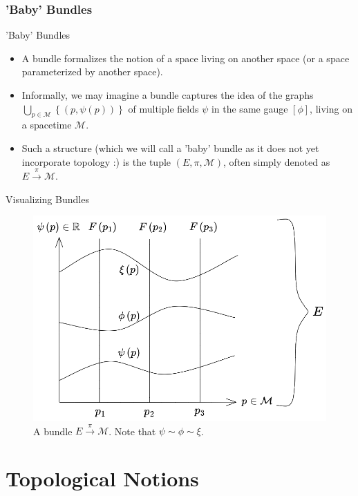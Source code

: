 \documentclass[9pt,handout]{beamer}
\begin{document}
\subsubsection{'Baby' Bundles}
\begin{frame}{'Baby' Bundles}
\begin{itemize}
\item A bundle formalizes the notion of a space living on another space (or a space parameterized by another space). 
\item Informally, we may imagine a bundle captures the idea of the graphs $\displaystyle{\bigcup_{p \in \mathcal{M}} \left\{ \left( p, \psi \left( p \right) \right) \right\}}$ of multiple fields $\psi$ in the same gauge $\left[ \phi \right]$, living on a spacetime $\mathcal{M}$.
\item Such a structure (which we will call a 'baby' bundle as it does not yet incorporate topology :) is the tuple $\left( E, \pi, \mathcal{M} \right)$, often simply denoted as $E \overset{\pi}{\to} \mathcal{M}$.
\end{itemize}
\end{frame}

\begin{frame}{Visualizing Bundles}
\begin{figure}[H]
\centering
\includegraphics[scale=0.3]{bundle}
\caption{A bundle $E \overset{\pi}{\to} \mathcal{M}$. Note that $\psi \sim \phi \sim \xi$.}
\end{figure}
\end{frame}

\section{Topological Notions}
\end{document}
